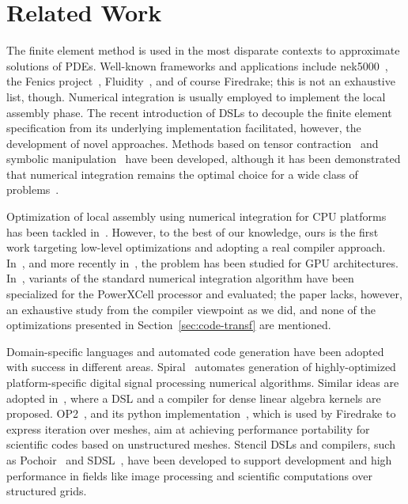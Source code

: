 \documentclass[conference]{IEEEtran}
\begin{document}
\section{Related Work}
\label{sec:related-work}
The finite element method is used in the most disparate contexts to approximate solutions of PDEs. Well-known frameworks and applications include nek5000~\cite{nek5000-web-page}, the Fenics project~\cite{Fenics}, Fluidity~\cite{fluidity_manual_v4}, and of course Firedrake; this is not an exhaustive list, though. Numerical integration is usually employed to implement the local assembly phase. The recent introduction of DSLs to decouple the finite element specification from its underlying implementation facilitated, however, the development of novel approaches. Methods based on tensor contraction~\cite{FFC-TC} and symbolic manipulation~\cite{Francis} have been developed, although it has been demonstrated that numerical integration remains the optimal choice for a wide class of problems~\cite{quadrature1}. 

Optimization of local assembly using numerical integration for CPU platforms has been tackled in~\cite{quadrature1}. However, to the best of our knowledge, ours is the first work targeting low-level optimizations and adopting a real compiler approach. In~\cite{Markall20101815}, and more recently in~\cite{petsc-integration-gpu}, the problem has been studied for GPU architectures. In~\cite{assembly-opencl}, variants of the standard numerical integration algorithm have been specialized for the PowerXCell processor and evaluated; the paper lacks, however, an exhaustive study from the compiler viewpoint as we did, and none of the optimizations presented in Section~\ref{sec:code-transf} are mentioned. 

Domain-specific languages and automated code generation have been adopted with success in different areas. Spiral~\cite{Pueschel:05} automates generation of highly-optimized platform-specific digital signal processing numerical algorithms. Similar ideas are adopted in~\cite{Spampinato:14}, where a DSL and a compiler for dense linear algebra kernels are proposed. OP2~\cite{op2-main}, and its python implementation~\cite{pyop2isc}, which is used by Firedrake to express iteration over meshes, aim at achieving performance portability for scientific codes based on unstructured meshes. Stencil DSLs and compilers, such as Pochoir~\cite{pochoir} and SDSL~\cite{stencil-compiler}, have been developed to support development and high performance in fields like image processing and scientific computations over structured grids.  
\end{document}
